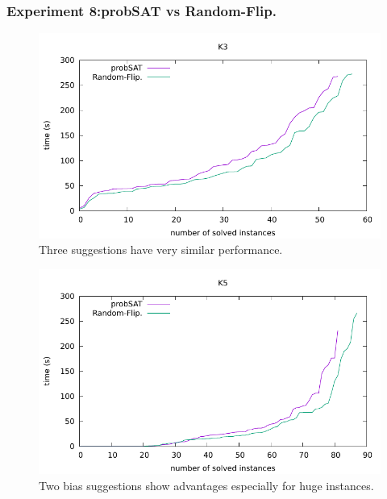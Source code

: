 \documentclass[12pt,a4paper,twoside]{scrartcl}
\numberwithin{equation}{section}
\begin{document}
\subsubsection{Experiment 8:probSAT vs Random-Flip.}  
\label{sec:Experiment 8}
  \begin{figure}[H]
\begin{center}
  \includegraphics[scale = 1]{DATA/K3/e4r.pdf}
  \end{center}
  \caption{Three suggestions have very similar performance.}
  \label{Experiment 8 k3 cactus plot}
  \end{figure}
  \begin{figure}[H]
\begin{center}
  \includegraphics[scale = 1]{DATA/K5/e4r.pdf}
  \end{center}
  \caption{Two bias suggestions show advantages especially for huge instances.}
  \label{Experiment 8 k5 cactus plot}
  \end{figure}
\end{document}
